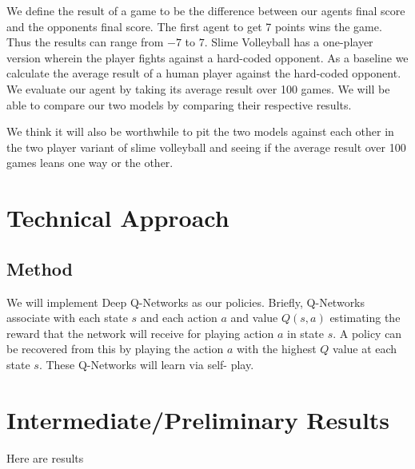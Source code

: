 \documentclass[10pt,twocolumn,letterpaper]{article}
\begin{document}
We define the result of a game to be the difference between our agents final score
and the opponents final score. The first agent to get 7 points wins the game.
Thus the results can range from $-7$ to $7$. Slime Volleyball has a one-player
version wherein the player fights against a hard-coded opponent. As a baseline
we calculate the average result of a human player against the hard-coded opponent. \\

\noindent We evaluate our agent by taking its average result over 100
games. We will be able to compare our two models by comparing their respective
results.

\noindent We think it will also be worthwhile to pit the two models against each
other in the two player variant of slime volleyball and seeing if the average
result over 100 games leans one way or the other.

\section{Technical Approach}

\subsection{Method} We will implement Deep Q-Networks as our policies. Briefly,
Q-Networks associate with each state $s$ and each action $a$ and value $Q(s, a)$
estimating the reward that the network will receive for playing action $a$ in
state $s$. A policy can be recovered from this by playing the action $a$ with
the highest $Q$ value at each state $s$. These Q-Networks will learn via self-
play.

\section{Intermediate/Preliminary Results}

Here are results



{\small


}
\end{document}

